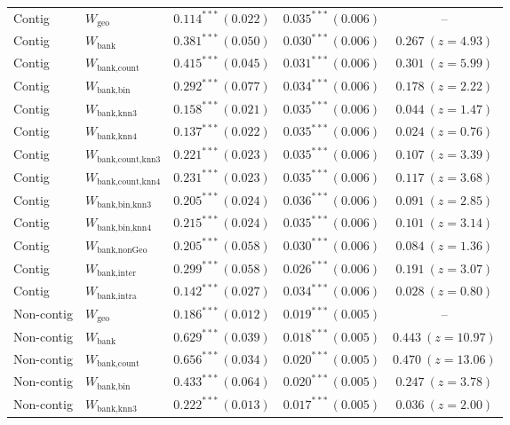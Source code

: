 \begin{table}[htbp]
\begin{tabular}{llccc}
    \addlinespace
    Contig & $W_{\text{geo}}$ & $0.114^{***}\,(0.022)$ & $0.035^{***}\,(0.006)$ & -- \\
    Contig & $W_{\text{bank}}$ & $0.381^{***}\,(0.050)$ & $0.030^{***}\,(0.006)$ & $0.267\ (z{=}4.93)$ \\
    Contig & $W_{\text{bank,count}}$ & $0.415^{***}\,(0.045)$ & $0.031^{***}\,(0.006)$ & $0.301\ (z{=}5.99)$ \\
    Contig & $W_{\text{bank,bin}}$ & $0.292^{***}\,(0.077)$ & $0.034^{***}\,(0.006)$ & $0.178\ (z{=}2.22)$ \\
    Contig & $W_{\text{bank,knn3}}$ & $0.158^{***}\,(0.021)$ & $0.035^{***}\,(0.006)$ & $0.044\ (z{=}1.47)$ \\
    Contig & $W_{\text{bank,knn4}}$ & $0.137^{***}\,(0.022)$ & $0.035^{***}\,(0.006)$ & $0.024\ (z{=}0.76)$ \\
    Contig & $W_{\text{bank,count,knn3}}$ & $0.221^{***}\,(0.023)$ & $0.035^{***}\,(0.006)$ & $0.107\ (z{=}3.39)$ \\
    Contig & $W_{\text{bank,count,knn4}}$ & $0.231^{***}\,(0.023)$ & $0.035^{***}\,(0.006)$ & $0.117\ (z{=}3.68)$ \\
    Contig & $W_{\text{bank,bin,knn3}}$ & $0.205^{***}\,(0.024)$ & $0.036^{***}\,(0.006)$ & $0.091\ (z{=}2.85)$ \\
    Contig & $W_{\text{bank,bin,knn4}}$ & $0.215^{***}\,(0.024)$ & $0.035^{***}\,(0.006)$ & $0.101\ (z{=}3.14)$ \\
    Contig & $W_{\text{bank,nonGeo}}$ & $0.205^{***}\,(0.058)$ & $0.030^{***}\,(0.006)$ & $0.084\ (z{=}1.36)$ \\
    Contig & $W_{\text{bank,inter}}$ & $0.299^{***}\,(0.058)$ & $0.026^{***}\,(0.006)$ & $0.191\ (z{=}3.07)$ \\
    Contig & $W_{\text{bank,intra}}$ & $0.142^{***}\,(0.027)$ & $0.034^{***}\,(0.006)$ & $0.028\ (z{=}0.80)$ \\
    \addlinespace
    Non-contig & $W_{\text{geo}}$ & $0.186^{***}\,(0.012)$ & $0.019^{***}\,(0.005)$ & -- \\
    Non-contig & $W_{\text{bank}}$ & $0.629^{***}\,(0.039)$ & $0.018^{***}\,(0.005)$ & $0.443\ (z{=}10.97)$ \\
    Non-contig & $W_{\text{bank,count}}$ & $0.656^{***}\,(0.034)$ & $0.020^{***}\,(0.005)$ & $0.470\ (z{=}13.06)$ \\
    Non-contig & $W_{\text{bank,bin}}$ & $0.433^{***}\,(0.064)$ & $0.020^{***}\,(0.005)$ & $0.247\ (z{=}3.78)$ \\
    Non-contig & $W_{\text{bank,knn3}}$ & $0.222^{***}\,(0.013)$ & $0.017^{***}\,(0.005)$ & $0.036\ (z{=}2.00)$ \\

\end{tabular}
\end{table}
